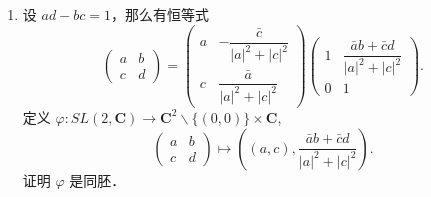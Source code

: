 \begin{enumerate}
    \item 设 $a d-b c=1$，那么有恒等式
    $$\begin{pmatrix}a & b \\c & d\end{pmatrix}
    =\begin{pmatrix}a & -\dfrac{\bar{c}}{|a|^2+|c|^2} \\
    c & \dfrac{\bar{a}}{|a|^2+|c|^2}\end{pmatrix}
    \begin{pmatrix}1 & \dfrac{\bar{a} b+\bar{c} d}{|a|^2+|c|^2} \\
    0 & 1\end{pmatrix}.$$
    定义 $\varphi: S L(2, \mathbf{C}) \rightarrow \mathbf{C}^2 \backslash\{(0,0)\} \times \mathbf{C}$,
    $$\begin{pmatrix}a & b \\c & d\end{pmatrix} \mapsto
    \left((a, c), \frac{\bar{a} b+\bar{c} d}{|a|^2+|c|^2}\right).$$
    证明 $\varphi$ 是同胚．
    

\end{enumerate}
